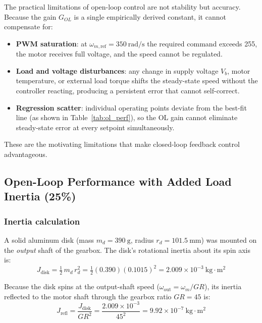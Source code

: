 \documentclass{article}
\begin{document}
The practical limitations of open-loop control are not stability but accuracy. Because the gain $G_{OL}$ is a single empirically derived constant, it cannot compensate for:
\begin{itemize}
    \item \textbf{PWM saturation}: at $\omega_{m,\mathrm{ref}} = 350~\text{rad/s}$ the required command exceeds 255, the motor receives full voltage, and the speed cannot be regulated.
    \item \textbf{Load and voltage disturbances}: any change in supply voltage $V_b$, motor temperature, or external load torque shifts the steady-state speed without the controller reacting, producing a persistent error that cannot self-correct.
    \item \textbf{Regression scatter}: individual operating points deviate from the best-fit line (as shown in Table~\ref{tab:ol_perf}), so the OL gain cannot eliminate steady-state error at every setpoint simultaneously.
\end{itemize}

These are the motivating limitations that make closed-loop feedback control advantageous.

\subsection{Open-Loop Performance with Added Load Inertia (25\%)}

\subsubsection*{Inertia calculation}

A solid aluminum disk (mass $m_d = 390~\text{g}$, radius $r_d = 101.5~\text{mm}$) was mounted on the \emph{output} shaft of the gearbox. The disk's rotational inertia about its spin axis is:
\begin{equation}
    J_{\text{disk}} = \tfrac{1}{2}\,m_d\,r_d^2
    = \tfrac{1}{2}(0.390)(0.1015)^2
    = 2.009 \times 10^{-3}~\text{kg}\!\cdot\!\text{m}^2
\end{equation}

Because the disk spins at the output-shaft speed ($\omega_{\text{out}} = \omega_m / GR$), its inertia reflected to the motor shaft through the gearbox ratio $GR = 45$ is:
\begin{equation}
    J_{\text{refl}} = \frac{J_{\text{disk}}}{GR^2}
    = \frac{2.009 \times 10^{-3}}{45^2}
    = 9.92 \times 10^{-7}~\text{kg}\!\cdot\!\text{m}^2
    \label{eq:j_refl}
\end{equation}
\end{document}
